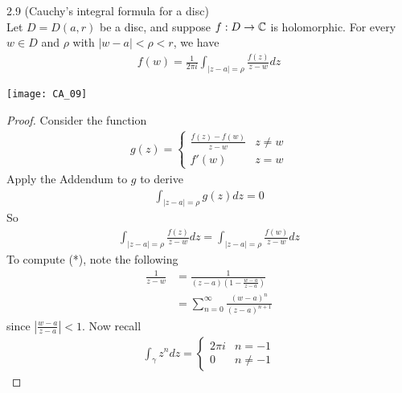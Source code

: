 \documentclass[a4paper]{article}
\begin{document}
\begin{thm} 2.9 (Cauchy's integral formula for a disc)\\
Let $D = D(a,r)$ be a disc, and suppose $f:D \to \mathbb{C}$ is holomorphic. For every $w \in D$ and $\rho$ with $|w-a|<\rho<r$, we have
\begin{equation*}
\begin{aligned}
f(w) = \frac{1}{2\pi i}\int_{|z-a|=\rho} \frac{f(z)}{z-w} dz
\end{aligned}
\end{equation*}

\texttt{[image: CA\_09]}
\begin{proof}
Consider the function
\begin{equation*}
\begin{aligned}
g(z) = \left\{ \begin{array}{ll}
\frac{f(z)-f(w)}{z-w} & z\neq w\\
f'(w) & z=w
\end{array}\right.
\end{aligned}
\end{equation*}
Apply the Addendum to $g$ to derive
\begin{equation*}
\begin{aligned}
\int_{|z-a|=\rho} g(z) dz = 0
\end{aligned}
\end{equation*}
So
\begin{equation*}\tag{*}
\begin{aligned}
\int_{|z-a|=\rho} \frac{f(z)}{z-w}dz = \int_{|z-a|=\rho} \frac{f(w)}{z-w}dz
\end{aligned}
\end{equation*}
To compute (*), note the following
\begin{equation*}
\begin{aligned}
\frac{1}{z-w} &= \frac{1}{(z-a)\left(1-\frac{w-a}{z-a}\right)}\\
&= \sum_{n=0}^\infty \frac{(w-a)^n}{(z-a)^{n+1}}
\end{aligned}
\end{equation*}
since $\left|\frac{w-a}{z-a}\right|<1$. Now recall
\begin{equation*}
\begin{aligned}
\int_\gamma z^n dz = \left\{\begin{array}{ll}
2\pi i & n = -1\\
0 & n \neq -1
\end{array}\right.
\end{aligned}
\end{equation*}

\end{proof}
\end{thm}
\end{document}
